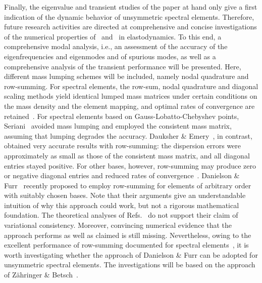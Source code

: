 Finally, the eigenvalue and transient studies of the paper at hand only give a first indication of the dynamic behavior of unsymmetric spectral elements. Therefore, future research activities are directed at comprehensive and concise investigations of the numerical properties of \PM\ and \PH\ in elastodynamics. To this end, a comprehensive modal analysis, i.e., an assessment of the accuracy of the eigenfrequencies and eigenmodes and of spurious modes, as well as a comprehensive analysis of the transient performance will be presented. Here, different mass lumping schemes will be included, namely nodal quadrature and row-summing. For spectral elements, the row-sum, nodal quadrature and diagonal scaling methods yield identical lumped mass matrices under certain conditions on the mass density and the element mapping, and optimal rates of convergence are retained~\cite{Duczek2019Mass}. For spectral elements based on Gauss-Lobatto-Chebyshev points, Seriani~\cite{Seriani1998Large} avoided mass lumping and employed the consistent mass matrix, assuming that lumping degrades the accuracy. Dauksher \& Emery~\cite{Dauksher1997Accuracy,Dauksher1999Evaluation,Dauksher2000Solution}, in contrast, obtained very accurate results with row-summing: the dispersion errors were approximately as small as those of the consistent mass matrix, and all diagonal entries stayed positive. For other bases, however, row-summing may produce zero or negative diagonal entries and reduced rates of convergence~\cite{Duczek2019Critical,Voet2023Mathematical}. Danielson \& Furr~\cite{Danielson2026Numerical} recently proposed to employ row-summing for elements of arbitrary order with suitably chosen bases. Note that their arguments give an understandable intuition of why this approach could work, but not a rigorous mathematical foundation. The theoretical analyses of Refs.~\cite{Duczek2019Mass,Voet2023Mathematical} do not support their claim of variational consistency. Moreover, convincing numerical evidence that the approach performs as well as claimed is still missing. Nevertheless, owing to the excellent performance of row-summing documented for spectral elements~\cite{Dauksher1997Accuracy,Dauksher2000Solution,Duczek2019Mass}, it is worth investigating whether the approach of Danielson \& Furr can be adopted for unsymmetric spectral elements. The investigations will be based on the approach of Z\"ahringer \& Betsch~\cite{Zaehringer2026On}.
